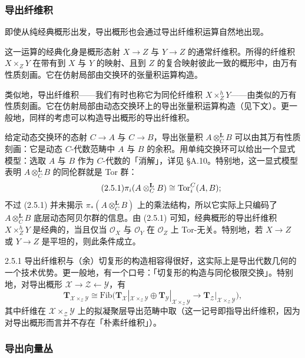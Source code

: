 \subsubsection{导出纤维积}

即使从纯经典概形出发，导出概形也会通过导出纤维积运算自然地出现。

这一运算的经典化身是概形态射 $X\to Z$ 与 $Y\to Z$ 的通常纤维积。所得的纤维积 $X\times_Z Y$ 在带有到 $X$ 与 $Y$ 的映射、且到 $Z$ 的复合映射彼此一致的概形中，由万有性质刻画。它在仿射局部由交换环的张量积运算构造。

类似地，导出纤维积——我们有时也称它为同伦纤维积 $X\times^h_Z Y$——由类似的万有性质刻画。它在仿射局部由动态交换环上的导出张量积运算构造（见下文）。更一般地，同样的考虑可以构造导出概形的导出纤维积。

给定动态交换环的态射 $C\to A$ 与 $C\to B$，导出张量积 $A\otimes^{\mathbf L}_C B$ 可以由其万有性质刻画：它是动态 $C$-代数范畴中 $A$ 与 $B$ 的余积。用单纯交换环可以给出一个显式模型：选取 $A$ 与 $B$ 作为 $C$-代数的「消解」，详见 §A.10。特别地，这一显式模型表明 $A\otimes^{\mathbf L}_C B$ 的同伦群就是 Tor 群：
\begin{equation}\tag{2.5.1}\label{eq:a6-01-2-5-1}
\pi_i(A\otimes^{\mathbf L}_C B)\cong\operatorname{Tor}^C_i(A,B);
\end{equation}
不过 (2.5.1) 并未揭示 $\pi_*(A\otimes^{\mathbf L}_C B)$ 上的乘法结构，所以它实际上只编码了 $A\otimes^{\mathbf L}_C B$ 底层动态阿贝尔群的信息。由 (2.5.1) 可知，经典概形的导出纤维积 $X\times^h_Z Y$ 是经典的，当且仅当 $\mathcal O_X$ 与 $\mathcal O_Y$ 在 $\mathcal O_Z$ 上 Tor-无关。特别地，若 $X\to Z$ 或 $Y\to Z$ 是平坦的，则此条件成立。

\begin{exam}{2.5.1}\label{exam:a6-01-6}
导出纤维积与（余）切复形的构造相容得很好，这实际上是导出代数几何的一个技术优势。更一般地，有一个口号：「切复形的构造与同伦极限交换」。特别地，对导出概形 $\mathcal X\to\mathcal Z\leftarrow\mathcal Y$，有
\[
\mathbf T_{\mathcal X\times_{\mathcal Z}\mathcal Y}\cong\mathrm{Fib}\big(\mathbf T_{\mathcal X}|_{\mathcal X\times_{\mathcal Z}\mathcal Y}\oplus\mathbf T_{\mathcal Y}|_{\mathcal X\times_{\mathcal Z}\mathcal Y}\to\mathbf T_{\mathcal Z}|_{\mathcal X\times_{\mathcal Z}\mathcal Y}\big),
\]
其中纤维在 $\mathcal X\times_{\mathcal Z}\mathcal Y$ 上的拟凝聚层导出范畴中取（这一记号即指导出纤维积，因为对导出概形而言并不存在「朴素纤维积」）。
\end{exam}

\subsubsection{导出向量丛}

